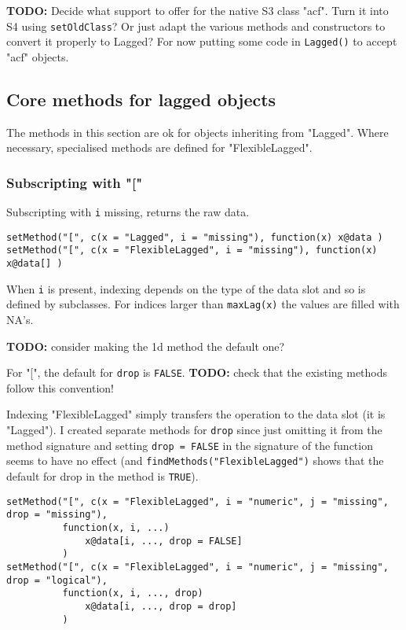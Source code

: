 \documentclass[11pt,a4paper]{article}
\begin{document}
\textbf{TODO:} Decide what support to offer for the native S3 class "acf". Turn it into S4 using
\texttt{setOldClass}? Or just adapt the various methods and constructors to convert it properly to
Lagged? For now putting some code in \texttt{Lagged()} to accept "acf" objects.

\subsection{Core methods for lagged objects}
\label{sec:orge6d2c91}

The methods in this section are ok for objects inheriting from "Lagged". Where
necessary, specialised methods are defined for "FlexibleLagged".


\subsubsection{Subscripting with "["}
\label{sec:org4ec62a3}

Subscripting with \texttt{i} missing, returns the raw data.
\begin{verbatim}
setMethod("[", c(x = "Lagged", i = "missing"), function(x) x@data )
setMethod("[", c(x = "FlexibleLagged", i = "missing"), function(x) x@data[] )
\end{verbatim}

When \texttt{i} is present, indexing depends on the type of the data slot and so is defined by
subclasses. For indices larger than \texttt{maxLag(x)} the values are filled with NA's.


\textbf{TODO:} consider making the 1d method the default one?

For "[", the default for \texttt{drop} is \texttt{FALSE}.
\textbf{TODO:} check that the existing methods follow this convention!

Indexing "FlexibleLagged" simply transfers the operation to the data slot (it is "Lagged").
I created separate methods for \texttt{drop} since just omitting it from the method signature and setting
\texttt{drop = FALSE} in the signature of the function seems to have no effect (and
\texttt{findMethods("FlexibleLagged")} shows that the default for drop in the method is \texttt{TRUE}).
\begin{verbatim}
setMethod("[", c(x = "FlexibleLagged", i = "numeric", j = "missing", drop = "missing"), 
          function(x, i, ...)
              x@data[i, ..., drop = FALSE] 
          )
setMethod("[", c(x = "FlexibleLagged", i = "numeric", j = "missing", drop = "logical"), 
          function(x, i, ..., drop)
              x@data[i, ..., drop = drop] 
          )
\end{verbatim}
\end{document}
